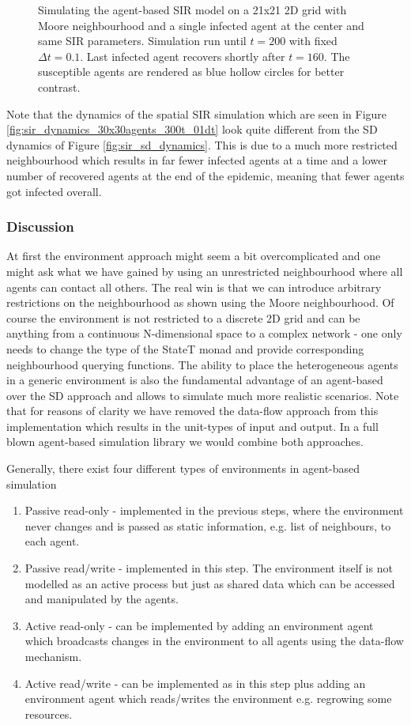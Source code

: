 \begin{figure}
\begin{center}
	\caption{Simulating the agent-based SIR model on a 21x21 2D grid with Moore neighbourhood and a single infected agent at the center and same SIR parameters. Simulation run until $t = 200$ with fixed $\Delta t = 0.1$. Last infected agent recovers shortly after $t = 160$. The susceptible agents are rendered as blue hollow circles for better contrast.}
	\label{fig:sir_env}
\end{center}
\end{figure}

Note that the dynamics of the spatial SIR simulation which are seen in Figure \ref{fig:sir_dynamics_30x30agents_300t_01dt} look quite different from the SD dynamics of Figure \ref{fig:sir_sd_dynamics}. This is due to a much more restricted neighbourhood which results in far fewer infected agents at a time and a lower number of recovered agents at the end of the epidemic, meaning that fewer agents got infected overall.

\subsubsection{Discussion}
At first the environment approach might seem a bit overcomplicated and one might ask what we have gained by using an unrestricted neighbourhood where all agents can contact all others. The real win is that we can introduce arbitrary restrictions on the neighbourhood as shown using the Moore neighbourhood. Of course the environment is not restricted to a discrete 2D grid and can be anything from a continuous N-dimensional space to a complex network - one only needs to change the type of the StateT monad and provide corresponding neighbourhood querying functions. The ability to place the heterogeneous agents in a generic environment is also the fundamental advantage of an agent-based over the SD approach and allows to simulate much more realistic scenarios. Note that for reasons of clarity we have removed the data-flow approach from this implementation which results in the unit-types of input and output. In a full blown agent-based simulation library we would combine both approaches.

Generally, there exist four different types of environments in agent-based simulation
\begin{enumerate}
	\item Passive read-only - implemented in the previous steps, where the environment never changes and is passed as static information, e.g. list of neighbours, to each agent.
	\item Passive read/write - implemented in this step. The environment itself is not modelled as an active process but just as shared data which can be accessed and manipulated by the agents.
	\item Active  read-only - can be implemented by adding an environment agent which broadcasts changes in the environment to all agents using the data-flow mechanism.
	\item Active read/write - can be implemented as in this step plus adding an environment agent which reads/writes the environment e.g. regrowing some resources.
\end{enumerate}

